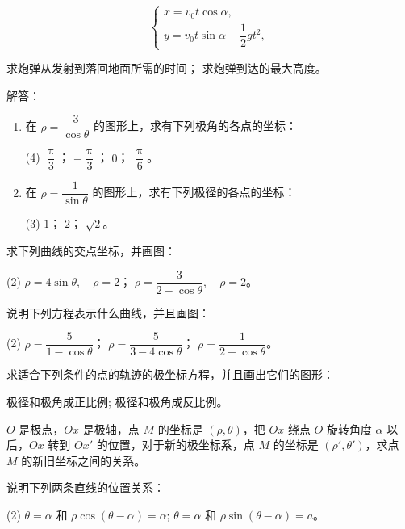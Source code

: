 \begin{question}
  \[ \begin{cases} x=v_0t\cos\alpha,\\ y=v_0t\sin\alpha-\dfrac{1}{2}gt^2,\end{cases} \]
  \begin{tasks}
    \task 求炮弹从发射到落回地面所需的时间；
    \task 求炮弹到达的最大高度。
  \end{tasks}
  \item 解答：
  \begin{enumerate}[itemindent=2em]
    \item 在 $\rho=\dfrac{3}{\cos\theta}$ 的图形上，求有下列极角的各点的坐标：
    \begin{tasks}(4)
      \task $\dfrac{\uppi}{3}$；
      \task $-\dfrac{\uppi}{3}$；
      \task $0$；
      \task $\dfrac{\uppi}{6}$。
    \end{tasks}
    \item 在 $\rho=\dfrac{1}{\sin\theta}$ 的图形上，求有下列极径的各点的坐标：
    \begin{tasks}(3)
      \task $1$；
      \task $2$；
      \task $\sqrt{2}$。
    \end{tasks}
  \end{enumerate}
  \item 求下列曲线的交点坐标，并画图：
  \begin{tasks}(2)
    \task $ \rho=4\sin\theta,\quad \rho=2$；
    \task $ \rho=\dfrac{3}{2-\cos\theta},\quad \rho=2$。
  \end{tasks}
  \item 说明下列方程表示什么曲线，并且画图：
  \begin{tasks}(2)
    \task $\rho=\dfrac{5}{1-\cos\theta}$；
    \task $\rho=\dfrac{5}{3-4\cos\theta}$；
    \task $\rho=\dfrac{1}{2-\cos\theta}$。
  \end{tasks}
  \item 求适合下列条件的点的轨迹的极坐标方程，并且画出它们的图形：
  \begin{tasks}
    \task 极径和极角成正比例;
    \task 极径和极角成反比例。
  \end{tasks}
  \item $O$ 是极点，$Ox$ 是极轴，点 $M$ 的坐标是 $(\rho,\theta)$，把 $Ox$ 绕点 $O$ 旋转角度 $\alpha$ 以后，$Ox$ 转到 $Ox'$ 的位置，对于新的极坐标系，点 $M$ 的坐标是 $(\rho',\theta')$，求点 $M$ 的新旧坐标之间的关系。
  \item 说明下列两条直线的位置关系：
  \begin{tasks}(2)
    \task $\theta=\alpha$ 和 $\rho\cos(\theta-\alpha)=\alpha$;
    \task $\theta=\alpha$ 和 $\rho\sin(\theta-\alpha)=a$。

\end{tasks}
\end{question}
